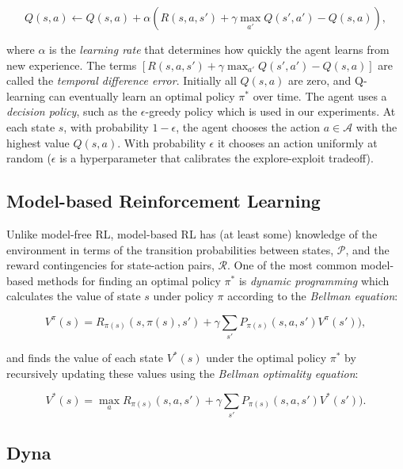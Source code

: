 \documentclass[letterpaper]{article}
\begin{document}
\begin{small}
\begin{equation}
Q(s,a) \leftarrow Q(s,a) + \alpha (R(s,a,s') + \gamma \max_{a'} Q(s', a') - Q(s,a)),
\end{equation}
\end{small}

\noindent
where $\alpha$ is the \textit{learning rate} that determines how quickly the agent learns from new experience. The terms $[R(s,a,s') + \gamma \max_{a'} Q(s', a') - Q(s,a)]$ are called the \textit{temporal difference error}. Initially all $Q(s,a)$ are zero, and Q-learning can eventually learn an optimal policy $\pi^*$ over time. The agent uses a \textit{decision policy}, such as the $\epsilon$-greedy policy which is used in our experiments. At each state $s$, with probability $1 - \epsilon$, the agent chooses the action $a \in \mathcal{A}$ with the highest value $Q(s,a)$. With probability $\epsilon$ it chooses an action uniformly at random ($\epsilon$ is a hyperparameter that calibrates the explore-exploit tradeoff).
 
\subsection{Model-based Reinforcement Learning}

Unlike model-free RL, model-based RL has (at least some) knowledge of the environment in terms of the transition probabilities between states, $\mathcal{P}$, and the reward contingencies for state-action pairs, $\mathcal{R}$. One of the most common model-based methods for finding an optimal policy $\pi^*$ is \textit{dynamic programming} which calculates the value of state $s$ under policy $\pi$ according to the \textit{Bellman equation}:

\begin{equation}
V^{\pi}(s) = R_{\pi(s)}(s,\pi(s),s') + \gamma \sum\limits_{s'} P_{\pi(s)}(s,a,s')V^{\pi}(s')),
\end{equation}

\noindent
and finds the value of each state $V^{*}(s)$ under the optimal policy $\pi^*$ by recursively updating these values using the \textit{Bellman optimality equation}:

\begin{equation}
V^{*}(s) = \max_a R_{\pi(s)}(s,a,s') + \gamma \sum\limits_{s'} P_{\pi(s)}(s,a,s')V^{*}(s')).
\end{equation}

\subsection{Dyna}
\end{document}
